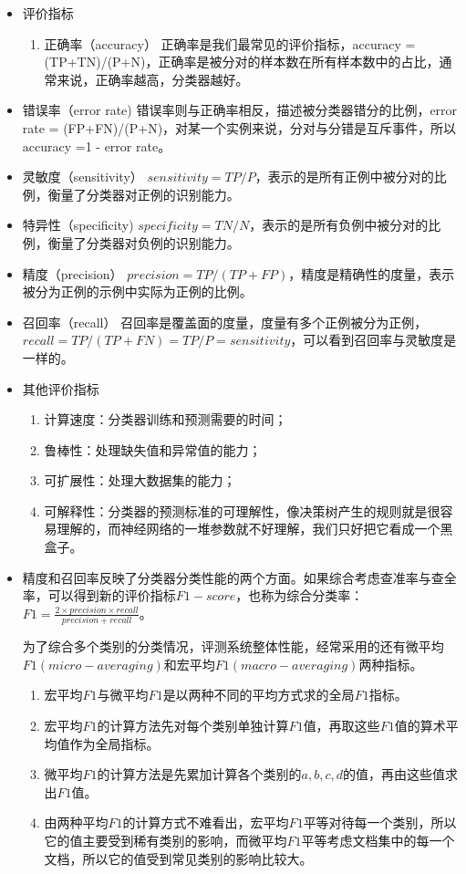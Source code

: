 \begin{itemize}
\item 评价指标
	\begin{enumerate}
		\item  正确率（accuracy） 正确率是我们最常见的评价指标，accuracy = (TP+TN)/(P+N)，正确率是被分对的样本数在所有样本数中的占比，通常来说，正确率越高，分类器越好。
	\end{enumerate}

\item 错误率（error rate) 错误率则与正确率相反，描述被分类器错分的比例，error rate = (FP+FN)/(P+N)，对某一个实例来说，分对与分错是互斥事件，所以accuracy =1 -  error rate。
\item 灵敏度（sensitivity） $sensitivity = TP/P$，表示的是所有正例中被分对的比例，衡量了分类器对正例的识别能力。
\item 特异性（specificity) $specificity = TN/N$，表示的是所有负例中被分对的比例，衡量了分类器对负例的识别能力。
\item 精度（precision） $precision=TP/(TP+FP)$，精度是精确性的度量，表示被分为正例的示例中实际为正例的比例。
\item 召回率（recall） 召回率是覆盖面的度量，度量有多个正例被分为正例，$recall=TP/(TP+FN)=TP/P=sensitivity$，可以看到召回率与灵敏度是一样的。
\item 其他评价指标
	\begin{enumerate}
		\item 计算速度：分类器训练和预测需要的时间；
  	\item 鲁棒性：处理缺失值和异常值的能力；
  	\item 可扩展性：处理大数据集的能力；
  	\item 可解释性：分类器的预测标准的可理解性，像决策树产生的规则就是很容易理解的，而神经网络的一堆参数就不好理解，我们只好把它看成一个黑盒子。
	\end{enumerate}
\item 精度和召回率反映了分类器分类性能的两个方面。如果综合考虑查准率与查全率，可以得到新的评价指标$F1-score$，也称为综合分类率：$F1=\frac{2 \times precision \times recall}{precision + recall}$。

		为了综合多个类别的分类情况，评测系统整体性能，经常采用的还有微平均$F1(micro-averaging)$和宏平均$F1(macro-averaging)$两种指标。

		\begin{enumerate}
			\item 宏平均$F1$与微平均$F1$是以两种不同的平均方式求的全局$F1$指标。
			\item 宏平均$F1$的计算方法先对每个类别单独计算$F1$值，再取这些$F1$值的算术平均值作为全局指标。
			\item 微平均$F1$的计算方法是先累加计算各个类别的$a,b,c,d$的值，再由这些值求出$F1$值。
			\item 由两种平均$F1$的计算方式不难看出，宏平均$F1$平等对待每一个类别，所以它的值主要受到稀有类别的影响，而微平均$F1$平等考虑文档集中的每一个文档，所以它的值受到常见类别的影响比较大。
		\end{enumerate}


\end{itemize}
